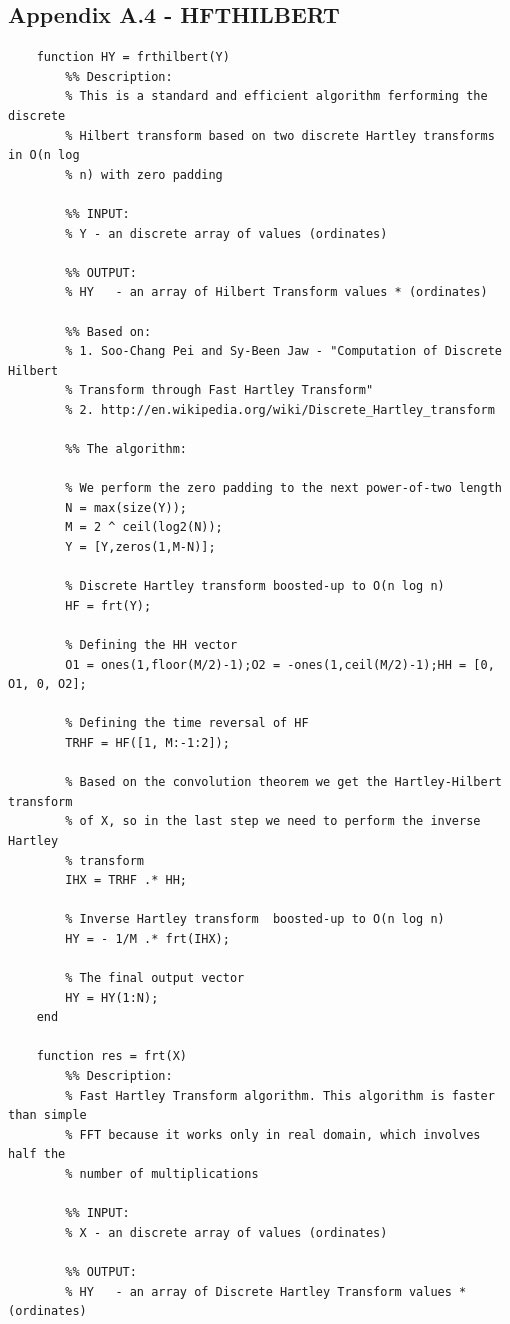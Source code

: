 \documentclass[12pt,twoside,a4paper]{article}
\numberwithin{equation}{subsection}
\numberwithin{figure}{subsection}
\begin{document}
\subsection*{Appendix A.4 - HFTHILBERT}
\begin{lstlisting}
	function HY = frthilbert(Y)
	    %% Description:
	    % This is a standard and efficient algorithm ferforming the discrete
	    % Hilbert transform based on two discrete Hartley transforms in O(n log
	    % n) with zero padding
	   
	    %% INPUT:
	    % Y - an discrete array of values (ordinates)
	    
	    %% OUTPUT:
	    % HY   - an array of Hilbert Transform values * (ordinates)
	    
	    %% Based on:
	    % 1. Soo-Chang Pei and Sy-Been Jaw - "Computation of Discrete Hilbert
	    % Transform through Fast Hartley Transform"
	    % 2. http://en.wikipedia.org/wiki/Discrete_Hartley_transform
	    
	    %% The algorithm:
	        
	    % We perform the zero padding to the next power-of-two length
	    N = max(size(Y));
	    M = 2 ^ ceil(log2(N));
	    Y = [Y,zeros(1,M-N)];
	    
	    % Discrete Hartley transform boosted-up to O(n log n)
	    HF = frt(Y);
	    
	    % Defining the HH vector
	    O1 = ones(1,floor(M/2)-1);O2 = -ones(1,ceil(M/2)-1);HH = [0, O1, 0, O2];
	    
	    % Defining the time reversal of HF
	    TRHF = HF([1, M:-1:2]);
	    
	    % Based on the convolution theorem we get the Hartley-Hilbert transform
	    % of X, so in the last step we need to perform the inverse Hartley
	    % transform
	    IHX = TRHF .* HH;
	    
	    % Inverse Hartley transform  boosted-up to O(n log n)
	    HY = - 1/M .* frt(IHX);
	    
	    % The final output vector
	    HY = HY(1:N);
	end

	function res = frt(X)
	    %% Description:
	    % Fast Hartley Transform algorithm. This algorithm is faster than simple 
	    % FFT because it works only in real domain, which involves half the 
	    % number of multiplications
	      
	    %% INPUT:
	    % X - an discrete array of values (ordinates)
	    
	    %% OUTPUT:
	    % HY   - an array of Discrete Hartley Transform values * (ordinates)
	    

\end{lstlisting}
\end{document}
